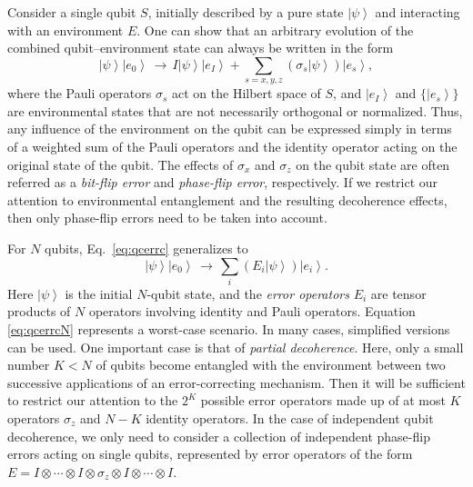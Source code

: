 \documentclass[aps,pra,reprint,amsmath,amssymb,showpacs,nofootinbib,floatfix,onecolumn,12pt]{revtex4-1}
\newcommand{\ket}[1]{\left\vert{#1}\right\rangle}
\begin{document}
Consider a single qubit $S$, initially described by a pure state $\ket{\psi}$ and interacting with an environment $E$. One can show that an arbitrary evolution of the combined qubit--environment state can always be written in the form
%
\begin{equation} \label{eq:qcerrc} \ket{\psi}
  \ket{e_0}  \, \longrightarrow \, I
  \ket{\psi} \ket{e_I} + \sum_{s= x,y,z }
  \left( \sigma_s \ket{\psi} \right)
  \ket{e_s},
\end{equation}
%
where the Pauli operators $\sigma_s$ act on the Hilbert space of $S$, and $\ket{e_I}$ and $\{ \ket{e_s} \}$ are environmental states that are not necessarily orthogonal or normalized. Thus, any influence of the environment on the qubit can be expressed simply in terms of a weighted sum of the Pauli operators and the identity operator acting on the original state of the qubit. The effects of $\sigma_x$ and $\sigma_z$ on the qubit state are often referred as a \emph{bit-flip error} and \emph{phase-flip error}, respectively. If we restrict our attention to environmental entanglement and the resulting decoherence effects, then only phase-flip errors need to be taken into account. 

For $N$ qubits, Eq.~\eqref{eq:qcerrc} generalizes to
%
\begin{equation}\label{eq:qcerrcN}
  \ket{\psi} \ket{e_0} \, \longrightarrow\,
  \sum_{i} 
  \left( E_i \ket{\psi} \right) \ket{e_i} .
\end{equation}
%
Here $\ket{\psi}$ is the initial $N$-qubit state, and the \emph{error operators} $E_i$ are tensor products of $N$ operators involving identity and Pauli
operators. Equation \eqref{eq:qcerrcN} represents a worst-case scenario. In many cases, simplified versions can be used. One important case is that of \emph{partial decoherence}. Here, only a small number $K < N$ of qubits become entangled with the environment between two successive applications of an error-correcting mechanism. Then it will be sufficient to restrict our attention to the $2^K$ possible error operators made up of at most $K$ operators $\sigma_z$ and $N-K$ identity operators. In the case of independent qubit decoherence, we only need to consider a collection of independent phase-flip errors acting on single qubits, represented by error operators of the form $E = I\otimes \cdots \otimes I\otimes \sigma_z \otimes I\otimes \cdots \otimes I$. 
\end{document}
